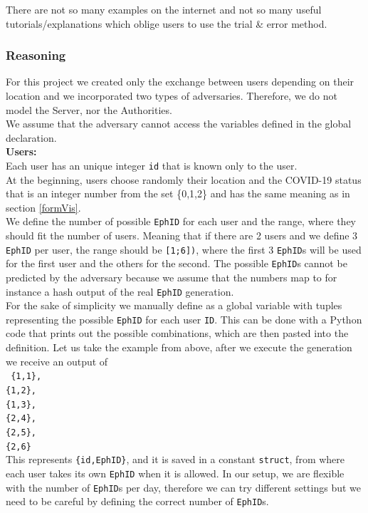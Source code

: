 \documentclass[a4paper, twocolumn]{article}
\begin{document}
\noindent There are not so many examples on the internet and not so many useful tutorials/explanations which oblige users to use the trial \& error method.

\subsubsection{Reasoning} \label{reasoning}
For this project we created only the exchange between users depending on their location and we incorporated two types of adversaries. Therefore, we do not model the Server, nor the Authorities.\\
We assume that the adversary cannot access the variables defined in the global declaration.\\

\noindent \textbf{Users:}\\
Each user has an unique integer \texttt{id} that is known only to the user.\\
At the beginning, users choose randomly their location and the COVID-19 status that is an integer number from the set \{0,1,2\} and has the same meaning as in section \ref{formVis}.\\
We define the number of possible \texttt{EphID} for each user and the range, where they should fit the number of users. Meaning that if there are 2 users and we define 3 \texttt{EphID} per user, the range should be \texttt{[1;6])}, where the first 3 \texttt{EphID}s will be used for the first user and the others for the second. The possible \texttt{EphID}s cannot be predicted by the adversary because we assume that the numbers map to for instance a hash output of the real \texttt{EphID} generation.\\
For the sake of simplicity we manually define as a global variable with tuples representing the possible \texttt{EphID} for each user \texttt{ID}. This can be done with a Python code that prints out the possible combinations, which are then pasted into the definition. Let us take the example from above, after we execute the generation we receive an output of \\
\texttt{
    \colorbox{backcolour}{\{1,1\},}\\
    \colorbox{backcolour}{\{1,2\},}\\
    \colorbox{backcolour}{\{1,3\},}\\
    \colorbox{backcolour}{\{2,4\},}\\
    \colorbox{backcolour}{\{2,5\},}\\
    \colorbox{backcolour}{\{2,6\}}
}\\
This represents \texttt{\{id,EphID\}}, and it is saved in a constant \texttt{struct}, from where each user takes its own \texttt{EphID} when it is allowed. In our setup, we are flexible with the number of \texttt{EphID}s per day, therefore we can try different settings but we need to be careful by defining the correct number of \texttt{EphID}s.\\
\end{document}
